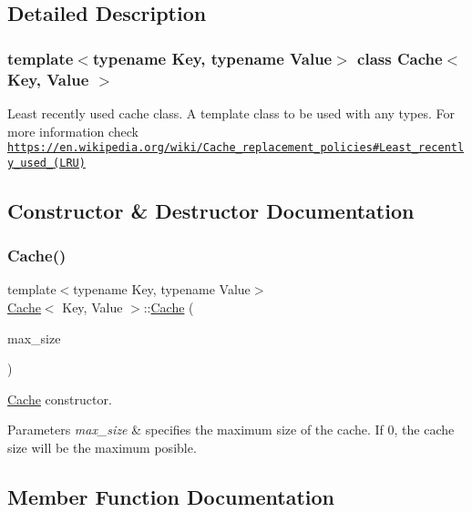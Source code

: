 \subsection{Detailed Description}
\subsubsection*{template$<$typename Key, typename Value$>$\newline
class Cache$<$ Key, Value $>$}

Least recently used cache class. A template class to be used with any types. For more information check \href{https://en.wikipedia.org/wiki/Cache_replacement_policies#Least_recently_used_(LRU)}{\tt https\+://en.\+wikipedia.\+org/wiki/\+Cache\+\_\+replacement\+\_\+policies\#\+Least\+\_\+recently\+\_\+used\+\_\+(\+L\+R\+U)} 

\subsection{Constructor \& Destructor Documentation}
\mbox{\label{classCache_aff01185fbb5b12ac5e139444e092b471}} 
\subsubsection{\texorpdfstring{Cache()}{Cache()}}
{\footnotesize\ttfamily template$<$typename Key, typename Value$>$ \\
\hyperlink{classCache}{Cache}$<$ Key, Value $>$\+::\hyperlink{classCache}{Cache} (\begin{DoxyParamCaption}\item[{size\+\_\+t}]{max\+\_\+size }\end{DoxyParamCaption})\hspace{0.3cm}{\ttfamily [inline]}}



\hyperlink{classCache}{Cache} constructor. 


\begin{DoxyParams}{Parameters}
{\em max\+\_\+size} & specifies the maximum size of the cache. If 0, the cache size will be the maximum posible. \\
\hline
\end{DoxyParams}


\subsection{Member Function Documentation}
\mbox{\label{classCache_a3cbee30a98148ba6e15e28e4e096d995}} 
